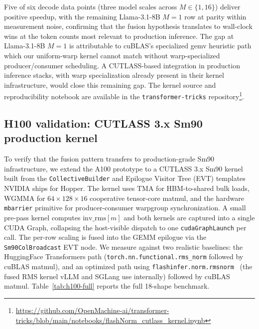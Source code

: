 \documentclass{article}
\begin{document}
Five of six decode data points (three model scales across $M \in \{1, 16\}$) deliver positive speedup, with the remaining Llama-3.1-8B $M{=}1$ row at parity within measurement noise, confirming that the fusion hypothesis translates to wall-clock wins at the token counts most relevant to production inference. The gap at Llama-3.1-8B $M{=}1$ is attributable to cuBLAS's specialized gemv heuristic path which our uniform-warp kernel cannot match without warp-specialized producer/consumer scheduling. A CUTLASS-based integration in production inference stacks, with warp specialization already present in their kernel infrastructure, would close this remaining gap.
The kernel source and reproducibility notebook are available in the \texttt{transformer-tricks} repository\footnote{\url{https://github.com/OpenMachine-ai/transformer-tricks/blob/main/notebooks/flashNorm\_cutlass\_kernel.ipynb}}.

\subsection{H100 validation: CUTLASS 3.x Sm90 production kernel}\label{app:h100-cutlass}

To verify that the fusion pattern transfers to production-grade Sm90 infrastructure, we extend the A100 prototype to a CUTLASS 3.x Sm90 kernel built from the \texttt{CollectiveBuilder} and Epilogue Visitor Tree (EVT) templates NVIDIA ships for Hopper. The kernel uses TMA for HBM-to-shared bulk loads, WGMMA for $64{\times}128{\times}16$ cooperative tensor-core matmul, and the hardware \texttt{mbarrier} primitive for producer-consumer warpgroup synchronization. A small pre-pass kernel computes $\mathrm{inv\_rms}[m]$ and both kernels are captured into a single CUDA Graph, collapsing the host-visible dispatch to one \texttt{cudaGraphLaunch} per call. The per-row scaling is fused into the GEMM epilogue via the \texttt{Sm90ColBroadcast} EVT node. We measure against two realistic baselines: the HuggingFace Transformers path (\texttt{torch.nn.functional.rms\_norm} followed by cuBLAS matmul), and an optimized path using \texttt{flashinfer.norm.rmsnorm}~\citep{flashInfer} (the fused RMS kernel vLLM and SGLang use internally) followed by cuBLAS matmul. Table~\ref{tab:h100-full} reports the full 18-shape benchmark.
\end{document}
